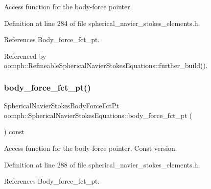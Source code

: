 Access function for the body-\/force pointer. 



Definition at line 284 of file spherical\+\_\+navier\+\_\+stokes\+\_\+elements.\+h.



References Body\+\_\+force\+\_\+fct\+\_\+pt.



Referenced by oomph\+::\+Refineable\+Spherical\+Navier\+Stokes\+Equations\+::further\+\_\+build().

\mbox{\label{classoomph_1_1SphericalNavierStokesEquations_a8a0362d47e0d6b757b21520b8d2026c6}} 
\subsubsection{\texorpdfstring{body\+\_\+force\+\_\+fct\+\_\+pt()}{body\_force\_fct\_pt()}\hspace{0.1cm}{\footnotesize\ttfamily [2/2]}}
{\footnotesize\ttfamily \hyperlink{classoomph_1_1SphericalNavierStokesEquations_aee36bea87063e9648a488de9e21f551d}{Spherical\+Navier\+Stokes\+Body\+Force\+Fct\+Pt} oomph\+::\+Spherical\+Navier\+Stokes\+Equations\+::body\+\_\+force\+\_\+fct\+\_\+pt (\begin{DoxyParamCaption}{ }\end{DoxyParamCaption}) const\hspace{0.3cm}{\ttfamily [inline]}}



Access function for the body-\/force pointer. Const version. 



Definition at line 288 of file spherical\+\_\+navier\+\_\+stokes\+\_\+elements.\+h.



References Body\+\_\+force\+\_\+fct\+\_\+pt.

\mbox{\label{classoomph_1_1SphericalNavierStokesEquations_a0d404ca488e2d464e1b21269431e6dad}} 
